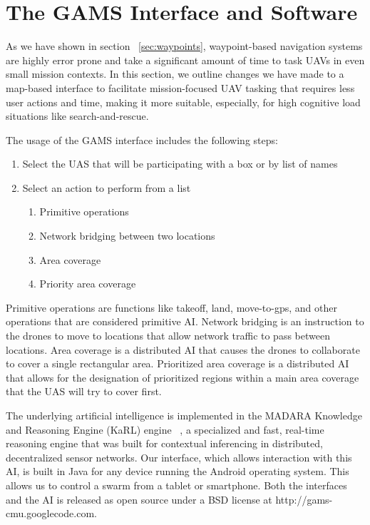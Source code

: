 \documentclass{sig-alternate-ipsn13}
\begin{document}
\section{The GAMS Interface and Software}
\label{sec:gams_interface}

As we have shown in section ~\ref{sec:waypoints}, waypoint-based
navigation systems are highly error prone and take a significant amount
of time to task UAVs in even small mission contexts. In this section, we
outline changes we have made to a map-based interface to facilitate
mission-focused UAV tasking that requires less user actions and time,
making it more suitable, especially, for high cognitive load situations like
search-and-rescue.

The usage of the GAMS interface includes the following steps:
\begin{enumerate}
  \item Select the UAS that will be participating with a box or by list of names
  \item Select an action to perform from a list
  \begin{enumerate}
    \item Primitive operations
    \item Network bridging between two locations
    \item Area coverage
    \item Priority area coverage
  \end{enumerate}
\end{enumerate}

Primitive operations are functions like takeoff, land, move-to-gps, and other
operations that are considered primitive AI. Network bridging is an instruction
to the drones to move to locations that allow network traffic to pass between
locations. Area coverage is a distributed AI that causes the drones to collaborate
to cover a single rectangular area. Prioritized area coverage is a distributed AI
that allows for the designation of prioritized regions within a main area coverage
that the UAS will try to cover first.

The underlying artificial intelligence is implemented in the MADARA Knowledge and
Reasoning Engine (KaRL) engine ~\cite{Edmondson-KaRL-ksem2011}, a specialized
and fast, real-time reasoning engine that was built for contextual inferencing in
distributed, decentralized sensor networks. Our interface, which allows
interaction with this AI, is built in Java for any device running the Android
operating system. This allows us to control a swarm from a tablet or smartphone.
Both the interfaces and the AI is released as open source under a BSD license
at http://gams-cmu.googlecode.com.
\end{document}
